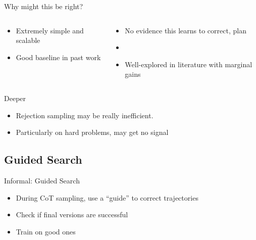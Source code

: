 \documentclass[14pt,aspectratio=169]{beamer}
\begin{document}
\begin{frame}{Why might this be right?}
	\begin{columns}
		\begin{column}{0.5\linewidth}
			\begin{itemize}
				\item Extremely simple and scalable
				\item Good baseline in past work
			\end{itemize}
		\end{column}
		\begin{column}{0.5\linewidth}
			\begin{itemize}
				\item No evidence this learns to correct, plan
				\item
				\item Well-explored in literature with marginal gains
			\end{itemize}
		\end{column}
	\end{columns}
\end{frame}

\begin{frame}{Deeper}
	\begin{itemize}
		\item Rejection sampling may be really inefficient.
		\item Particularly on hard problems, may get no signal
	\end{itemize}
\end{frame}

\subsection{Guided Search}

\begin{frame}{Informal: Guided Search}
	\begin{itemize}
		\item During CoT sampling, use a ``guide'' to
		      correct trajectories
		\item Check if final versions are successful
		\item Train on good ones
	\end{itemize}
\end{frame}
\end{document}
